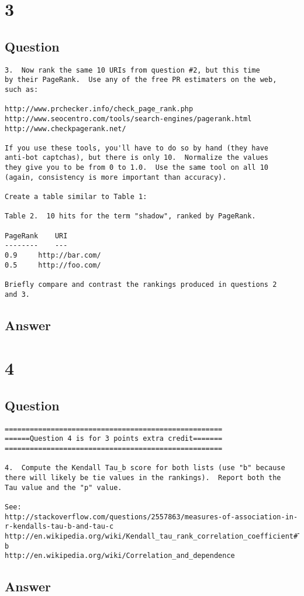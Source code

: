 \documentclass[letterpaper,11pt]{article}
\begin{document}
\section*{3}

\subsection*{Question}

\begin{verbatim}
3.  Now rank the same 10 URIs from question #2, but this time 
by their PageRank.  Use any of the free PR estimaters on the web,
such as:

http://www.prchecker.info/check_page_rank.php
http://www.seocentro.com/tools/search-engines/pagerank.html
http://www.checkpagerank.net/

If you use these tools, you'll have to do so by hand (they have
anti-bot captchas), but there is only 10.  Normalize the values
they give you to be from 0 to 1.0.  Use the same tool on all 10
(again, consistency is more important than accuracy).

Create a table similar to Table 1:

Table 2.  10 hits for the term "shadow", ranked by PageRank.

PageRank	URI
--------	---
0.9		http://bar.com/
0.5		http://foo.com/

Briefly compare and contrast the rankings produced in questions 2
and 3.
\end{verbatim}

\newpage
\subsection*{Answer}

\newpage
\section*{4}

\subsection*{Question}

\begin{verbatim}
====================================================
======Question 4 is for 3 points extra credit=======
====================================================

4.  Compute the Kendall Tau_b score for both lists (use "b" because
there will likely be tie values in the rankings).  Report both the
Tau value and the "p" value.

See: 
http://stackoverflow.com/questions/2557863/measures-of-association-in-r-kendalls-tau-b-and-tau-c
http://en.wikipedia.org/wiki/Kendall_tau_rank_correlation_coefficient#Tau-b
http://en.wikipedia.org/wiki/Correlation_and_dependence
\end{verbatim}

\newpage
\subsection*{Answer}
\end{document}
